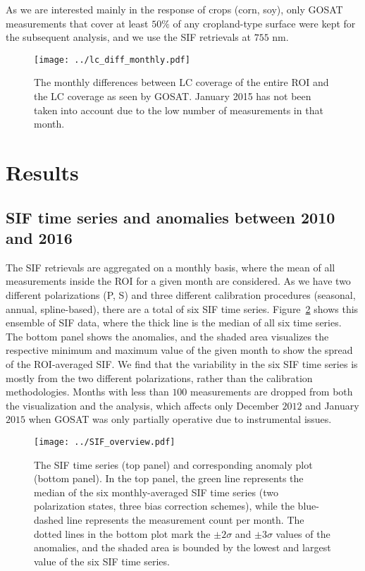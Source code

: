 \documentclass[preprint, a4paper, 10pt, times, 5p]{elsarticle}
\begin{document}
As we are interested mainly in the response of crops (corn, soy), only GOSAT measurements that cover at least $50\%$ of any cropland-type surface were kept for the subsequent analysis, and we use the SIF retrievals at $755$ nm.

 
\begin{figure}[htbp]
\centering
\texttt{[image: ../lc\_diff\_monthly.pdf]}
\caption{The monthly differences between LC coverage of the entire ROI and the LC coverage as seen by GOSAT. January 2015 has not been taken into account due to the low number of measurements in that month.}
\label{fig:lc_diff_monthly}
\end{figure}

 
\section{Results}

\subsection{SIF time series and anomalies between 2010 and 2016}
\label{sec:SIF_TS}

The SIF retrievals are aggregated on a monthly basis, where the mean of all measurements inside the ROI for a given month are considered. As we have two different polarizations (P, S) and three different calibration procedures (seasonal, annual, spline-based), there are a total of six SIF time series. Figure~\ref{fig:sif_ts} shows this ensemble of SIF data, where the thick line is the median of all six time series. The bottom panel shows the anomalies, and the shaded area visualizes the respective minimum and maximum value of the given month to show the spread of the ROI-averaged SIF. We find that the variability in the six SIF time series is mostly from the two different polarizations, rather than the calibration methodologies. Months with less than $100$ measurements are dropped from both the visualization and the analysis, which affects only December $2012$ and January $2015$ when GOSAT was only partially operative due to instrumental issues.

\begin{figure}[htbp]
\centering
\texttt{[image: ../SIF\_overview.pdf]}
\caption{The SIF time series (top panel) and corresponding anomaly plot (bottom panel). In the top panel, the green line represents the median of the six monthly-averaged SIF time series (two polarization states, three bias correction schemes), while the blue-dashed line represents the measurement count per month. The dotted lines in the bottom plot mark the $\pm 2\sigma$ and $\pm 3\sigma$ values of the anomalies, and the shaded area is bounded by the lowest and largest value of the six SIF time series.}
\label{fig:sif_ts}
\end{figure}
\end{document}
